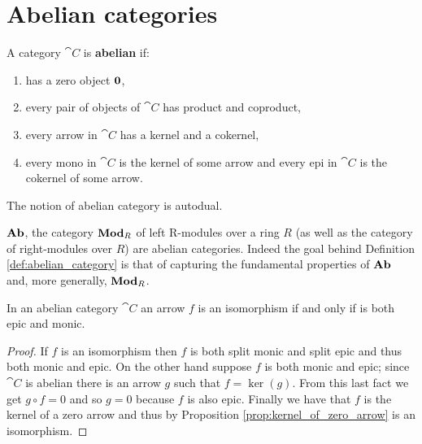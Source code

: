 \newpage
\section{Abelian categories}
\label{sec:abelian}
\begin{definition}
  \label{def:abelian_category}
  A category \(\cat{C}\) is {\bf abelian} if:
  \begin{enumerate}[label=(\arabic*)]
  \item has a zero object \({\bf 0}\),
  \item every pair of objects of \(\cat{C}\) has product and coproduct,
  \item every arrow in \(\cat{C}\) has a kernel and a cokernel,
  \item every mono in \(\cat{C}\) is the kernel of some arrow and every epi in \(\cat{C}\) is the cokernel of some arrow.
  \end{enumerate}
\end{definition}

\begin{remark}
  The notion of abelian category is autodual.
\end{remark}

\begin{example}
  \label{ex:ab_is_abelian}
  \(\text{\normalfont\textbf{Ab}}\), the category \(\text{\normalfont\textbf{Mod}}_R\) of left R-modules over a ring \(R\) (as well as the category of right-modules over \(R\)) are abelian categories. Indeed the goal behind Definition \ref{def:abelian_category} is that of capturing the fundamental properties of \(\text{\normalfont\textbf{Ab}}\) and, more generally, \(\text{\normalfont\textbf{Mod}}_R\).
\end{example}

\begin{proposition}
  \label{prop:iso_mono_epi}
  In an abelian category \(\cat{C}\) an arrow \(f\) is an isomorphism if and only if is both epic and monic.
\end{proposition}

\begin{proof}
  If \(f\) is an isomorphism then \(f\) is both split monic and split epic and thus both monic and epic. On the other hand suppose \(f\) is both monic and epic; since \(\cat{C}\) is abelian there is an arrow \(g\) such that \(f = \ker(g)\). From this last fact we get \(g\circ f = 0\) and so \(g = 0\) because \(f\) is also epic. Finally we have that \(f\) is the kernel of a zero arrow and thus by Proposition \ref{prop:kernel_of_zero_arrow} is an isomorphism.
\end{proof}

